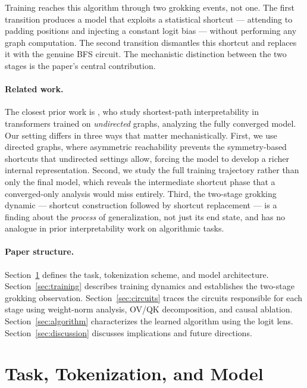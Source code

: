 \documentclass[11pt, a4paper]{article}
\begin{document}
Training reaches this algorithm through two grokking events, not one.
The first transition produces a model that exploits a statistical
shortcut --- attending to padding positions and injecting a constant
logit bias --- without performing any graph computation.  The second
transition dismantles this shortcut and replaces it with the genuine
BFS circuit.  The mechanistic distinction between the two stages is the
paper's central contribution.

\paragraph{Related work.}
The closest prior work is \citet{cohen2025spectral}, who study
shortest-path interpretability in transformers trained on \emph{undirected}
graphs, analyzing the fully converged model.  Our setting differs in three
ways that matter mechanistically.  First, we use directed graphs, where
asymmetric reachability prevents the symmetry-based shortcuts that
undirected settings allow, forcing the model to develop a richer internal
representation.  Second, we study the full training trajectory rather than
only the final model, which reveals the intermediate shortcut phase that
a converged-only analysis would miss entirely.  Third, the two-stage
grokking dynamic --- shortcut construction followed by shortcut
replacement --- is a finding about the \emph{process} of generalization,
not just its end state, and has no analogue in prior interpretability
work on algorithmic tasks.

\paragraph{Paper structure.}
Section~\ref{sec:task} defines the task, tokenization scheme, and
model architecture.  Section~\ref{sec:training} describes training
dynamics and establishes the two-stage grokking observation.
Section~\ref{sec:circuits} traces the circuits responsible for each
stage using weight-norm analysis, OV/QK decomposition, and causal
ablation.  Section~\ref{sec:algorithm} characterizes the learned
algorithm using the logit lens.  Section~\ref{sec:discussion} discusses
implications and future directions.

\section{Task, Tokenization, and Model}
\label{sec:task}
\end{document}
